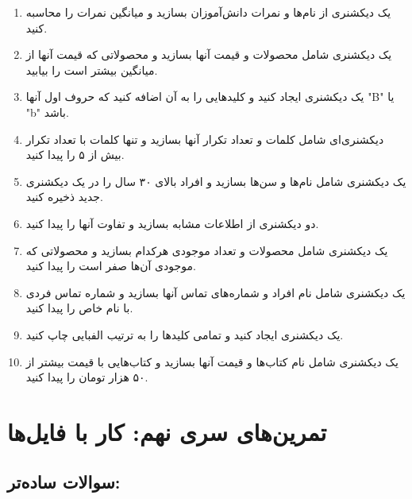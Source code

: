 \documentclass[a4paper,12pt]{article}
\begin{document}
	\begin{enumerate}
		\item یک دیکشنری از نام‌ها و نمرات دانش‌آموزان بسازید و میانگین نمرات را محاسبه کنید.
		\item یک دیکشنری شامل محصولات و قیمت آنها بسازید و محصولاتی که قیمت آنها از میانگین بیشتر است را بیابید.
		\item یک دیکشنری ایجاد کنید و کلیدهایی را به آن اضافه کنید که حروف اول آنها "B" یا "b" باشد.
		\item دیکشنری‌ای شامل کلمات و تعداد تکرار آنها بسازید و تنها کلمات با تعداد تکرار بیش از ۵ را پیدا کنید.
		\item یک دیکشنری شامل نام‌ها و سن‌ها بسازید و افراد بالای ۳۰ سال را در یک دیکشنری جدید ذخیره کنید.
		\item دو دیکشنری از اطلاعات مشابه بسازید و تفاوت آنها را پیدا کنید.
		\item یک دیکشنری شامل محصولات و تعداد موجودی هرکدام بسازید و محصولاتی که موجودی آن‌ها صفر است را پیدا کنید.
		\item یک دیکشنری شامل نام افراد و شماره‌های تماس آنها بسازید و شماره تماس فردی با نام خاص را پیدا کنید.
		\item یک دیکشنری ایجاد کنید و تمامی کلیدها را به ترتیب الفبایی چاپ کنید.
		\item یک دیکشنری شامل نام کتاب‌ها و قیمت آنها بسازید و کتاب‌هایی با قیمت بیشتر از ۵۰ هزار تومان را پیدا کنید.
	\end{enumerate}
	
	
	
	\newpage
	\section*{تمرین‌های سری نهم: کار با فایل‌ها}
	
	\subsection*{سوالات ساده‌تر:}
	
\end{document}
